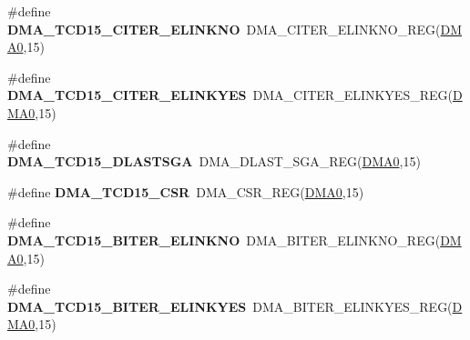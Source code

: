\begin{DoxyCompactItemize}
\item 
\#define {\bfseries D\+M\+A\+\_\+\+T\+C\+D15\+\_\+\+C\+I\+T\+E\+R\+\_\+\+E\+L\+I\+N\+K\+NO}~D\+M\+A\+\_\+\+C\+I\+T\+E\+R\+\_\+\+E\+L\+I\+N\+K\+N\+O\+\_\+\+R\+EG(\hyperlink{group__DMA__Peripheral__Access__Layer_ga4103044f9ca209772f513dc694513ffb}{D\+M\+A0},15)\hypertarget{group__DMA__Register__Accessor__Macros_gaa8ed6e0682627b986b2ed3b7a7ccd157}{}\label{group__DMA__Register__Accessor__Macros_gaa8ed6e0682627b986b2ed3b7a7ccd157}

\item 
\#define {\bfseries D\+M\+A\+\_\+\+T\+C\+D15\+\_\+\+C\+I\+T\+E\+R\+\_\+\+E\+L\+I\+N\+K\+Y\+ES}~D\+M\+A\+\_\+\+C\+I\+T\+E\+R\+\_\+\+E\+L\+I\+N\+K\+Y\+E\+S\+\_\+\+R\+EG(\hyperlink{group__DMA__Peripheral__Access__Layer_ga4103044f9ca209772f513dc694513ffb}{D\+M\+A0},15)\hypertarget{group__DMA__Register__Accessor__Macros_ga9b6c6be7d544c5d50b83c331307017f4}{}\label{group__DMA__Register__Accessor__Macros_ga9b6c6be7d544c5d50b83c331307017f4}

\item 
\#define {\bfseries D\+M\+A\+\_\+\+T\+C\+D15\+\_\+\+D\+L\+A\+S\+T\+S\+GA}~D\+M\+A\+\_\+\+D\+L\+A\+S\+T\+\_\+\+S\+G\+A\+\_\+\+R\+EG(\hyperlink{group__DMA__Peripheral__Access__Layer_ga4103044f9ca209772f513dc694513ffb}{D\+M\+A0},15)\hypertarget{group__DMA__Register__Accessor__Macros_ga490c3331e921f78f70ba0faba15987f1}{}\label{group__DMA__Register__Accessor__Macros_ga490c3331e921f78f70ba0faba15987f1}

\item 
\#define {\bfseries D\+M\+A\+\_\+\+T\+C\+D15\+\_\+\+C\+SR}~D\+M\+A\+\_\+\+C\+S\+R\+\_\+\+R\+EG(\hyperlink{group__DMA__Peripheral__Access__Layer_ga4103044f9ca209772f513dc694513ffb}{D\+M\+A0},15)\hypertarget{group__DMA__Register__Accessor__Macros_gab094c103d137f49a7195ff869b5cade1}{}\label{group__DMA__Register__Accessor__Macros_gab094c103d137f49a7195ff869b5cade1}

\item 
\#define {\bfseries D\+M\+A\+\_\+\+T\+C\+D15\+\_\+\+B\+I\+T\+E\+R\+\_\+\+E\+L\+I\+N\+K\+NO}~D\+M\+A\+\_\+\+B\+I\+T\+E\+R\+\_\+\+E\+L\+I\+N\+K\+N\+O\+\_\+\+R\+EG(\hyperlink{group__DMA__Peripheral__Access__Layer_ga4103044f9ca209772f513dc694513ffb}{D\+M\+A0},15)\hypertarget{group__DMA__Register__Accessor__Macros_gaf8dff77e7ddaad31d2a84ccd50a0714b}{}\label{group__DMA__Register__Accessor__Macros_gaf8dff77e7ddaad31d2a84ccd50a0714b}

\item 
\#define {\bfseries D\+M\+A\+\_\+\+T\+C\+D15\+\_\+\+B\+I\+T\+E\+R\+\_\+\+E\+L\+I\+N\+K\+Y\+ES}~D\+M\+A\+\_\+\+B\+I\+T\+E\+R\+\_\+\+E\+L\+I\+N\+K\+Y\+E\+S\+\_\+\+R\+EG(\hyperlink{group__DMA__Peripheral__Access__Layer_ga4103044f9ca209772f513dc694513ffb}{D\+M\+A0},15)\hypertarget{group__DMA__Register__Accessor__Macros_gac55c6f49386c76dc2d5705da3b7efb7e}{}\label{group__DMA__Register__Accessor__Macros_gac55c6f49386c76dc2d5705da3b7efb7e}


\end{DoxyCompactItemize}
